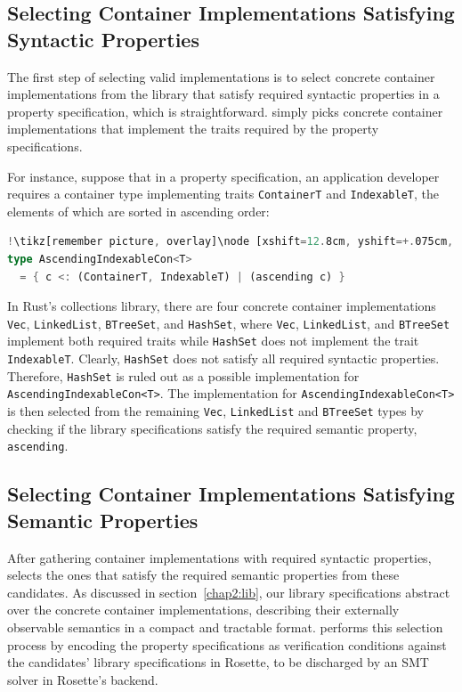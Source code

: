 \subsection{Selecting Container Implementations Satisfying Syntactic Properties}
\label{chap2:select:syntactic}
The first step of selecting valid implementations is to select concrete container implementations from the library that satisfy required syntactic properties in a property specification, which is straightforward. \Primrose{} simply picks concrete container implementations that implement the traits required by the property specifications. 

For instance, suppose that in a property specification, an application developer requires a container type implementing traits \lstinline|ContainerT| and \lstinline|IndexableT|, the elements of which are sorted in ascending order:
\begin{lstlisting}[language=Rust, style=boxed, caption={Property specification composing properties: \mylstinline{ascending}, \mylstinline{ContainerT} and \mylstinline{IndexableT}}, captionpos=t, label=select:ascending-random-eg]
!\tikz[remember picture, overlay]\node [xshift=12.8cm, yshift=+.075cm, inner sep=0.075cm, rectangle] {\footnotesize\bfseries\texttt{Primrose}};!property ascending { \c -> (for-all-consecutive-pairs c leq?) }
type AscendingIndexableCon<T>
  = { c <: (ContainerT, IndexableT) | (ascending c) }
\end{lstlisting}
In Rust's collections library, there are four concrete container implementations \lstinline|Vec|, \lstinline|LinkedList|, \lstinline|BTreeSet|, and \lstinline|HashSet|, where \lstinline|Vec|, \lstinline|LinkedList|, and \lstinline|BTreeSet| implement both required traits while \lstinline|HashSet| does not implement the trait \lstinline|IndexableT|. Clearly, \lstinline|HashSet| does not satisfy all required syntactic properties. Therefore, \lstinline|HashSet| is ruled out as a possible implementation for \lstinline{AscendingIndexableCon<T>}. 
The implementation for \lstinline{AscendingIndexableCon<T>} is then selected from the remaining \lstinline|Vec|, \lstinline|LinkedList| and \lstinline|BTreeSet| types by checking if the library specifications satisfy the required semantic property, \lstinline|ascending|.

\subsection{Selecting Container Implementations Satisfying Semantic Properties}
\label{chap2:select:semantic}
After gathering container implementations with required syntactic properties, \Primrose{} selects the ones that satisfy the required semantic properties from these candidates. As discussed in section~\ref{chap2:lib}, our library specifications abstract over the concrete container implementations, describing their externally observable semantics in a compact and tractable format.
\Primrose{} performs this selection process by encoding the property specifications as verification conditions against the candidates' library specifications in Rosette, to be discharged by an SMT solver in Rosette's backend.

